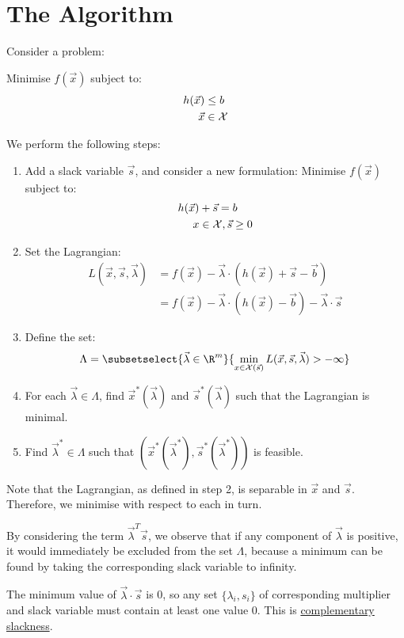 \documentclass[../Main.tex]{subfiles}
\begin{document}
\section{The Algorithm}
Consider a problem:

Minimise $f(\vec{x})$ subject to:
\begin{align*}
    h(\vec{x}) &\leq b \\
    \vec{x} &\in \mathcal{X}
\end{align*}

We perform the following steps:
\begin{enumerate}
    \item Add a slack variable $\vec{s}$, and consider a new formulation:
        Minimise $f(\vec{x})$ subject to:
        \begin{align*}
            h(\vec{x}) &+ \vec{s} = b \\
            x &\in \mathcal{X}, \vec{s} \geq 0
        \end{align*}
    \item Set the Lagrangian:
        \begin{align*}
            L(\vec{x}, \vec{s}, \vec{\lambda}) &= f(\vec{x}) - \vec{\lambda} \cdot (h(\vec{x}) + \vec{s} - \vec{b}) \\
            &= f(\vec{x}) - \vec{\lambda} \cdot (h(\vec{x}) - \vec{b}) - \vec{\lambda} \cdot \vec{s}
        \end{align*}
    \item Define the set:
        \begin{equation*}
            \Lambda = \subsetselect{\vec{\lambda} \in \R^m}{\min_{x \in \Xset(\vec{s})} L(\vec{x}, \vec{s}, \vec{\lambda}) > -\infty}
        \end{equation*}
    \item For each $\vec{\lambda} \in \Lambda$, find $\vec{x}^*(\vec{\lambda})$ and $\vec{s}^*(\vec{\lambda})$ such that the Lagrangian is minimal.
    \item Find $\vec{\lambda}^* \in \Lambda$ such that $(\vec{x}^*(\vec{\lambda}^*), \vec{s}^*(\vec{\lambda}^*))$ is feasible.
\end{enumerate}
\begin{remarks}
    \item Note that the Lagrangian, as defined in step 2, is separable in $\vec{x}$ and $\vec{s}$. Therefore, we minimise with respect to each in turn.
    \item By considering the term $\vec{\lambda}^T \vec{s}$, we observe that if any component of $\vec{\lambda}$ is positive, it would immediately be excluded from the set $\Lambda$, because a minimum can be found by taking the corresponding slack variable to infinity.
    \item The minimum value of $\vec{\lambda} \cdot \vec{s}$ is 0, so any set $\{\lambda_i, s_i\}$ of corresponding multiplier and slack variable must contain at least one value $0$. This is \underline{complementary slackness}.
\end{remarks}
\end{document}
